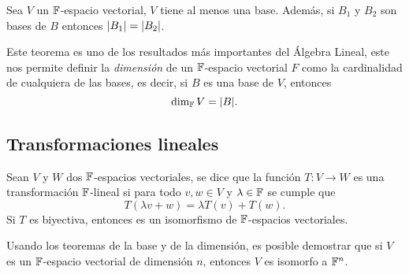 \begin{teor}
  Sea $V$ un $\mathbb{F}$-espacio vectorial, $V$ tiene al menos una base. Además, si $B_1$ y $B_2$ son bases de $B$ entonces $\mathopen|B_1\mathclose| = \mathopen|B_2\mathclose|$.
\end{teor}

Este teorema es uno de los resultados más importantes del Álgebra Lineal, este nos permite definir la \emph{dimensión} de un $\mathbb{F}$-espacio vectorial $F$ como la cardinalidad de cualquiera de las bases, es decir, si $B$ es una base de $V$, entonces
\[ \dim_{\mathbb{F}} V = \mathopen|B\mathclose|. \]

\subsection{Transformaciones lineales}

\begin{defi}
  Sean $V$ y $W$ dos $\mathbb{F}$-espacios vectoriales, se dice que la función $T\colon V\to W$ es una transformación $\mathbb{F}$-lineal si para todo $v,w \in V$ y $\lambda \in \mathbb{F}$ se cumple que 
  \[ T(\lambda v + w) = \lambda T(v) + T(w).\]
  Si $T$ es biyectiva, entonces es un isomorfismo de $\mathbb{F}$-espacios vectoriales.
\end{defi}

Usando los teoremas de la base y de la dimensión, es posible demostrar que si $V$ es un $\mathbb{F}$-espacio vectorial de dimensión $n$, entonces $V$ es isomorfo a $\mathbb{F}^n$.